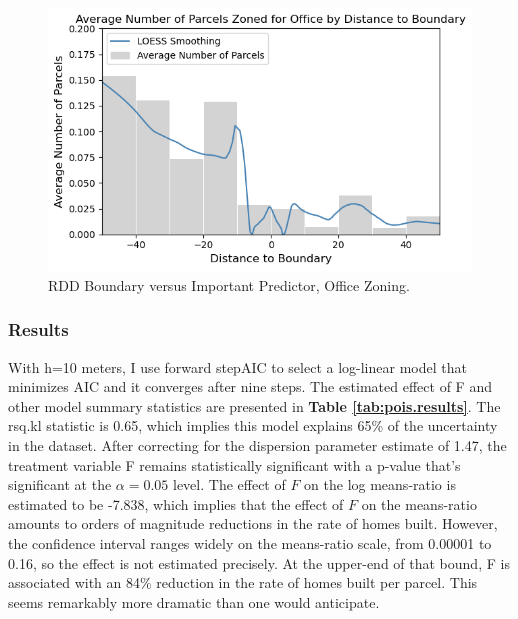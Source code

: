 \documentclass[a4paper,12pt]{article}
\begin{document}
\begin{figure}[hbt]
    \centering
    \includegraphics[scale=.8]{rdd/office_zoning_boundary.png}
    \caption{RDD Boundary versus Important Predictor, Office Zoning.}
    \label{fig:office_zoning_boundary}
\end{figure}

\subsubsection{Results}

With h=10 meters, I use forward stepAIC to select a log-linear model that minimizes AIC and it converges after nine steps. The estimated effect of F and other model summary statistics are presented in \textbf{Table \ref{tab:pois.results}}. The rsq.kl statistic is 0.65, which implies this model explains 65\% of the uncertainty in the dataset. After correcting for the dispersion parameter estimate of 1.47, the treatment variable F remains statistically significant with a p-value that's significant at the $\alpha=0.05$ level. The effect of $F$ on the log means-ratio is estimated to be -7.838, which implies that the effect of $F$ on the means-ratio amounts to orders of magnitude reductions in the rate of homes built. However, the confidence interval ranges widely on the means-ratio scale, from 0.00001 to 0.16, so the effect is not estimated precisely. At the upper-end of that bound, F is associated with an 84\% reduction in the rate of homes built per parcel. This seems remarkably more dramatic than one would anticipate.
\end{document}

